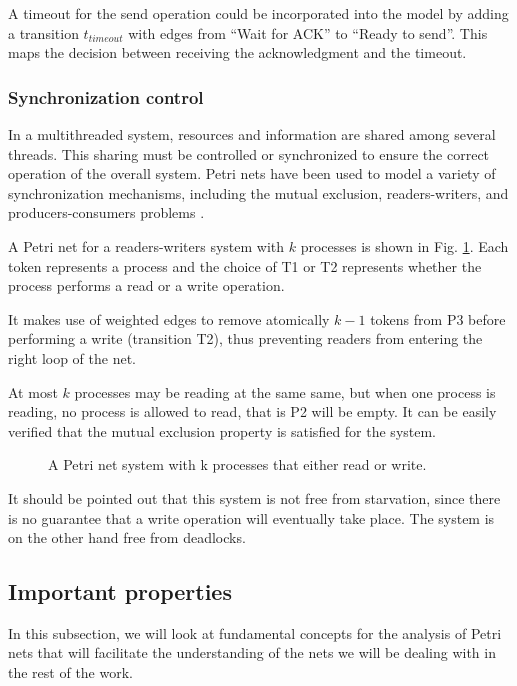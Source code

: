 A timeout for the send operation could be incorporated into the model
by adding a transition $t_{timeout}$ with edges from ``Wait for ACK'' to ``Ready to send''.
This maps the decision between receiving the acknowledgment and the timeout.

\subsubsection{Synchronization control}

In a multithreaded system, resources and information are shared among several threads.
This sharing must be controlled or synchronized
to ensure the correct operation of the overall system.
Petri nets have been used to model a variety of synchronization mechanisms,
including the mutual exclusion, readers-writers, and producers-consumers problems \cite{murata1989}.

A Petri net for a readers-writers system with $k$ processes
is shown in Fig. \ref{fig:readers-writers-example}.
Each token represents a process and the choice of T1 or T2
represents whether the process performs a read or a write operation.

It makes use of weighted edges to remove atomically
$k - 1$ tokens from P3 before performing a write (transition T2),
thus preventing readers from entering the right loop of the net.

At most $k$ processes may be reading at the same same,
but when one process is reading, no process is allowed to read, that is P2 will be empty.
It can be easily verified that the mutual exclusion property is satisfied for the system.

\begin{figure}[!htbp]
      \centering
      
      \caption{A Petri net system with k processes that either read or write.}
      \label{fig:readers-writers-example}
\end{figure}

It should be pointed out that this system is not free from starvation,
since there is no guarantee that a write operation will eventually take place.
The system is on the other hand free from deadlocks.

\subsection{Important properties}

In this subsection, we will look at fundamental concepts for the analysis of Petri nets
that will facilitate the understanding of the nets we will be dealing with in the rest of the work.


